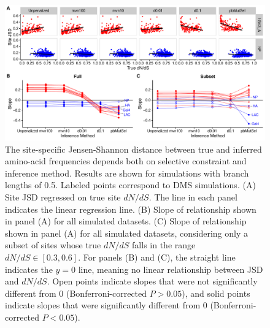 \documentclass[11pt]{article}
\begin{document}
\vspace{3cm}
\begin{figure}[htbp]
  \centerline{\includegraphics[width=7in]{Figures/jsd_truednds_slopes.pdf}}
  \caption{\label{fig:jsd_vs_dnds} The site-specific Jensen-Shannon distance between true and inferred amino-acid frequencies depends both on selective constraint and inference method. Results are shown for simulations with branch lengths of 0.5. Labeled points correspond to DMS simulations. (A) Site JSD regressed on true site $dN/dS$. The line in each panel indicates the linear regression line. (B) Slope of relationship shown in panel (A) for all simulated datasets. (C) Slope of relationship shown in panel (A) for all simulated datasets, considering only a subset of sites whose true $dN/dS$ falls in the range $dN/dS\in[0.3,0.6]$. For panels (B) and (C), the straight line indicates the $y=0$ line, meaning no linear relationship between JSD and $dN/dS$. Open points indicate slopes that were not significantly different from 0 (Bonferroni-corrected $P>0.05$), and solid points indicate slopes that were significantly different from 0 (Bonferroni-corrected $P<0.05$).}
 \end{figure}
\end{document}
